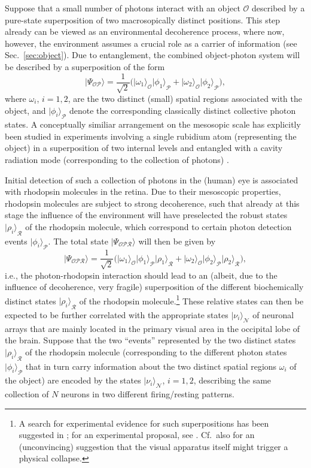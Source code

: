 \documentclass[12pt,aps,floatfix,amsmath,amssymb,showpacs,nofootinbib]{revtex4-2}
\newcommand{\be}{\begin{equation}} \newcommand{\ee}{\end{equation}}
\newcommand{\ket}[1]{\ensuremath{|{#1\rangle}}}
\begin{document}
Suppose that a small number of photons interact with an object
$\mathcal{O}$ described by a pure-state superposition of two
macrosopically distinct positions. This step already can be viewed as
an environmental decoherence process, where now, however, the
environment assumes a crucial role as a carrier of information (see
Sec.~\ref{sec:object}). Due to entanglement, the combined
object-photon system will be described by a superposition of the form
%
\be
\ket{\Psi_\mathcal{OP}} = \frac{1}{\sqrt{2}} \bigl(
\ket{\omega_1}_\mathcal{O} \ket{\phi_1}_\mathcal{P} +
\ket{\omega_2}_\mathcal{O} \ket{\phi_2}_\mathcal{P} \bigr),
\ee
%
where $\omega_i$, $i=1,2$, are the two distinct (small) spatial
regions associated with the object, and $\ket{\phi_i}_\mathcal{P}$
denote the corresponding classically distinct collective photon
states. A conceptually similiar arrangement on the mesosopic scale has
explicitly been studied in experiments involving a single rubidium
atom (representing the object) in a superposition of two internal
levels and entangled with a cavity radiation mode (corresponding to
the collection of photons) \cite{Brune:1996:om,Raimond:1997:um}.

Initial detection of such a collection of photons in the (human) eye
is associated with rhodopsin molecules in the retina.  Due to their
mesoscopic properties, rhodopsin molecules are subject to strong
decoherence, such that already at this stage the influence of the
environment will have preselected the robust states
$\ket{\rho_i}_\mathcal{R}$ of the rhodopsin molecule, which correspond
to certain photon detection events $\ket{\phi_i}_\mathcal{P}$.  The
total state $\ket{\Psi_\mathcal{OPR}}$ will then be given by
%
\be
\ket{\Psi_\mathcal{OPR}} = \frac{1}{\sqrt{2}} \bigl(
\ket{\omega_1}_\mathcal{O} \ket{\phi_1}_\mathcal{P}
\ket{\rho_1}_\mathcal{R} +
\ket{\omega_2}_\mathcal{O} \ket{\phi_2}_\mathcal{P}
\ket{\rho_2}_\mathcal{R} \bigr),
\ee
%
i.e., the photon-rhodopsin interaction should lead to an (albeit, due
to the influence of decoherence, very fragile) superposition of the
different biochemically distinct states $\ket{\rho_i}_\mathcal{R}$ of
the rhodopsin molecule.\footnote{A search for experimental evidence
  for such superpositions has been suggested in
  \cite{Shimony:1998:yy}; for an experimental proposal, see
  \cite{Hilaire:2002:ya}. Cf.\ also \cite{Thaheld:2005:om}
  for an (unconvincing) suggestion that the visual apparatus itself
  might trigger a physical collapse.} These relative states can then be
expected to be further correlated with the appropriate states
$\ket{\nu_i}_\mathcal{N}$ of neuronal arrays that are mainly located
in the primary visual area in the occipital lobe of the brain. Suppose
that the two ``events'' represented by the two distinct states
$\ket{\rho_i}_\mathcal{R}$ of the rhodopsin molecule (corresponding to
the different photon states $\ket{\phi_i}_\mathcal{P}$ that in turn
carry information about the two distinct spatial regions $\omega_i$ of
the object) are encoded by the states $\ket{\nu_i}_\mathcal{N}$,
$i=1,2$, describing the same collection of $N$ neurons in two
different firing/resting patterns.
\end{document}
